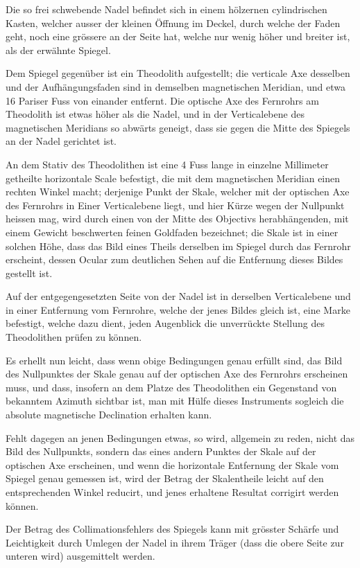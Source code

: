 \documentclass[12pt,a4paper]{article}
\begin{document}
Die so frei schwebende Nadel befindet sich in einem hölzernen cylindrischen Kasten, welcher ausser der kleinen Öffnung im Deckel, durch welche der Faden geht, noch eine grössere an der Seite hat, welche nur wenig höher und breiter ist, als der erwähnte Spiegel.

Dem Spiegel gegenüber ist ein Theodolith aufgestellt; die verticale Axe desselben und der Aufhängungsfaden sind in demselben magnetischen Meridian, und etwa 16 Pariser Fuss von einander entfernt. Die optische Axe des Fernrohrs am Theodolith ist etwas höher als die Nadel, und in der Verticalebene des magnetischen Meridians so abwärts geneigt, dass sie gegen die Mitte des Spiegels an der Nadel gerichtet ist.

An dem Stativ des Theodolithen ist eine 4 Fuss lange in einzelne Millimeter getheilte horizontale Scale befestigt, die mit dem magnetischen Meridian einen rechten Winkel macht; derjenige Punkt der Skale, welcher mit der optischen Axe des Fernrohrs in Einer Verticalebene liegt, und hier Kürze wegen der Nullpunkt heissen mag, wird durch einen von der Mitte des Objectivs herabhängenden, mit einem Gewicht beschwerten feinen Goldfaden bezeichnet; die Skale ist in einer solchen Höhe, dass das Bild eines Theils derselben im Spiegel durch das Fernrohr erscheint, dessen Ocular zum deutlichen Sehen auf die Entfernung dieses Bildes gestellt ist.

Auf der entgegengesetzten Seite von der Nadel ist in derselben Verticalebene und in einer Entfernung vom Fernrohre, welche der jenes Bildes gleich ist, eine Marke befestigt, welche dazu dient, jeden Augenblick die unverrückte Stellung des Theodolithen prüfen zu können.

Es erhellt nun leicht, dass wenn obige Bedingungen genau erfüllt sind, das Bild des Nullpunktes der Skale genau auf der optischen Axe des Fernrohrs erscheinen muss, und dass, insofern an dem Platze des Theodolithen ein Gegenstand von bekanntem Azimuth sichtbar ist, man mit Hülfe dieses Instruments sogleich die absolute magnetische Declination erhalten kann.

Fehlt dagegen an jenen Bedingungen etwas, so wird, allgemein zu reden, nicht das Bild des Nullpunkts, sondern das eines andern Punktes der Skale auf der optischen Axe erscheinen, und wenn die horizontale Entfernung der Skale vom Spiegel genau gemessen ist, wird der Betrag der Skalentheile leicht auf den entsprechenden Winkel reducirt, und jenes erhaltene Resultat corrigirt werden können.

Der Betrag des Collimationsfehlers des Spiegels kann mit grösster Schärfe und Leichtigkeit durch Umlegen der Nadel in ihrem Träger (dass die obere Seite zur unteren wird) ausgemittelt werden.
\end{document}

